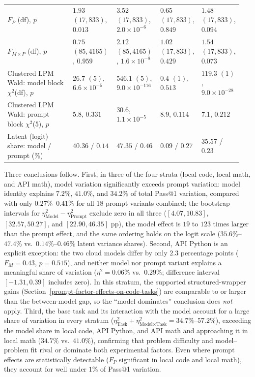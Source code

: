 \documentclass[a4paper,fleqn]{cas-sc}
\begin{document}
\begin{table}[htbp]
\begin{tabular}{@{}p{0.27\linewidth}p{0.17\linewidth}p{0.17\linewidth}p{0.17\linewidth}p{0.17\linewidth}@{}}
$F_P$ (df), $p$ & $1.93$ $(17, 833)$, $0.013$ & $3.52$ $(17, 833)$, $2.0 \times 10^{-6}$ & $0.65$ $(17, 833)$, $0.849$ & $1.48$ $(17, 833)$, $0.094$ \\
$F_{M \times P}$ (df), $p$ & $0.75$ $(85, 4165)$, $0.959$ & $2.12$ $(85, 4165)$, $1.6 \times 10^{-8}$ & $1.02$ $(17, 833)$, $0.429$ & $1.54$ $(17, 833)$, $0.073$ \\
\addlinespace[2pt]
Clustered LPM Wald: model block $\chi^2$(df), $p$ & $26.7$ $(5)$, $6.6 \times 10^{-5}$ & $546.1$ $(5)$, $9.0 \times 10^{-116}$ & $0.4$ $(1)$, $0.513$ & $119.3$ $(1)$, $9.0 \times 10^{-28}$ \\
Clustered LPM Wald: prompt block $\chi^2$(5), $p$ & $5.8$, $0.331$ & $30.6$, $1.1 \times 10^{-5}$ & $8.9$, $0.114$ & $7.1$, $0.212$ \\
\addlinespace[2pt]
Latent (logit) share: model / prompt (\%) & $40.36$ / $0.14$ & $47.35$ / $0.46$ & $0.09$ / $0.27$ & $35.57$ / $0.23$ \\
\bottomrule
\end{tabular}
\end{table}

Three conclusions follow. First, in three of the four strata (local code, local math, and API math), model variation significantly exceeds prompt variation: model identity explains $7.2\%$, $41.0\%$, and $34.2\%$ of total Pass@1 variation, compared with only $0.27\%$--$0.41\%$ for all 18 prompt variants combined; the bootstrap intervals for $\eta^2_{\text{Model}} - \eta^2_{\text{Prompt}}$ exclude zero in all three ($[4.07, 10.83]$, $[32.57, 50.27]$, and $[22.90, 46.35]$ pp), the model effect is $19$ to $123$ times larger than the prompt effect, and the same ordering holds on the logit scale ($35.6\%$--$47.4\%$ vs.\ $0.14\%$--$0.46\%$ latent variance shares). Second, API Python is an explicit exception: the two cloud models differ by only $2.3$ percentage points ($F_M = 0.43$, $p = 0.515$), and neither model nor prompt variant explains a meaningful share of variation ($\eta^2 = 0.06\%$ vs.\ $0.29\%$; difference interval $[-1.31, 0.39]$ includes zero). In this stratum, the supported structured-wrapper gains (Section~\ref{prompt-factor-effects-on-code-tasks}) are comparable to or larger than the between-model gap, so the ``model dominates'' conclusion does \emph{not} apply. Third, the base task and its interaction with the model account for a large share of variation in every stratum ($\eta^2_{\text{Task}} + \eta^2_{\text{Model} \times \text{Task}} = 34.7\%$--$57.2\%$), exceeding the model share in local code, API Python, and API math and approaching it in local math ($34.7\%$ vs.\ $41.0\%$), confirming that problem difficulty and model--problem fit rival or dominate both experimental factors. Even where prompt effects are statistically detectable ($F_P$ significant in local code and local math), they account for well under $1\%$ of Pass@1 variation.
\end{document}

